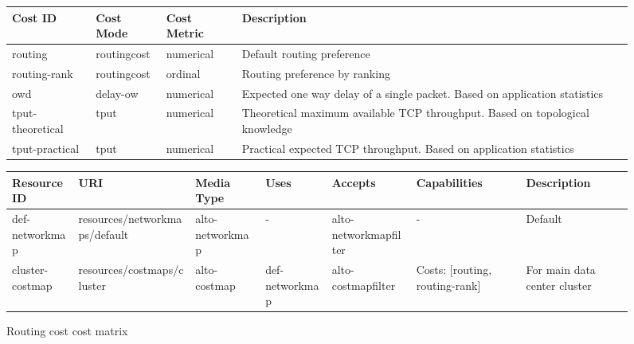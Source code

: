 \begin{figure}
    \centering
        \begin{subtable}{1\linewidth}
        \centering
        \scriptsize
        \begin{tabular}{|l|l|l|l|}
        \hline
        \bf{Cost ID}     & \bf{Cost Mode}   & \bf{Cost Metric} & \bf{Description}                                                                \\ \hline
        routing          & routingcost      & numerical        & Default routing preference                                                      \\ \hline
        routing-rank     & routingcost      & ordinal          & Routing preference by ranking                                                   \\ \hline
        owd              & delay-ow         & numerical        & Expected one way delay of a single packet. Based on application statistics      \\ \hline
        tput-theoretical & tput             & numerical        & Theoretical maximum available TCP throughput. Based on topological knowledge    \\ \hline
        tput-practical   & tput             & numerical        & Practical expected TCP throughput. Based on application statistics              \\ \hline
        \end{tabular}
        \caption{Routing cost cost matrix}
        \end{subtable}
        \begin{subtable}{1\linewidth}
        \centering
        \hspace*{-8em}
        \tiny
        \begin{tabular}{|l|l|l|l|l|l|l|}
        \hline
        Resource ID             & URI                                & Media Type        & Uses           & Accepts                 & Capabilities                                              & Description                                   \\ \hline
        def-networkmap          & resources/networkmaps/default      & alto-networkmap   & -              & alto-networkmapfilter   & -                                                         & Default                           \\ \hline
        cluster-costmap         & resources/costmaps/cluster         & alto-costmap      & def-networkmap & alto-costmapfilter      & Costs: {[}routing, routing-rank{]} & For main data center cluster         \\ \hline

\end{tabular}
\end{subtable}
\end{figure}
